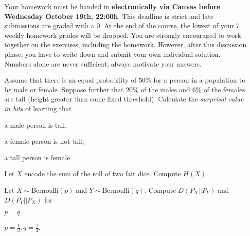 \documentclass[a4paper,10pt,landscape,twocolumn]{scrartcl}
\newcommand\deadline{Wednesday October 19th, 22:00h}
\begin{document}
\homeworkproblems

{\sffamily\noindent
  Your homework must be handed in \textbf{electronically via
  \href{\canvasURL}{Canvas} before \deadline}. This deadline is strict and late
  submissions are graded with a 0. At the end of the course, the lowest of your
  7 weekly homework grades will be dropped. You are strongly encouraged to work
  together on the exercises, including the homework. However, after this
  discussion phase, you have to write down and submit your own individual
  solution. Numbers alone are never sufficient, always motivate your answers.
}


\begin{exercise}
  Assume that there is an equal probability of $50\%$ for a person in a
  population to be male or female. Suppose further that $20\%$ of the males and
  $6\%$ of the females are tall (height greater than some fixed threshold).
  Calculate the \emph{surprisal value in bits} of learning that
  
  \begin{subex}
    a male person is tall, 
  \end{subex}
  
  \begin{subex}
    a female person is not tall, 
  \end{subex}
  
  \begin{subex}
    a tall person is female.
  \end{subex}
\end{exercise}


\begin{exercise}
  Let $X$ encode the sum of the roll of two fair dice. Compute $H(X)$.
\end{exercise}


\begin{exercise}
  Let $X \sim \text{Bernoulli}(p)$ and $Y \sim \text{Bernoulli}(q)$. Compute
  $D(P_X || P_Y)$ and $D(P_Y || P_X)$ for
  
  \begin{subex}
    $p=q$
  \end{subex}
  
  \begin{subex}
    $p=\frac 1 3, q=\frac 1 4$.
  \end{subex}
\end{exercise}
\end{document}
